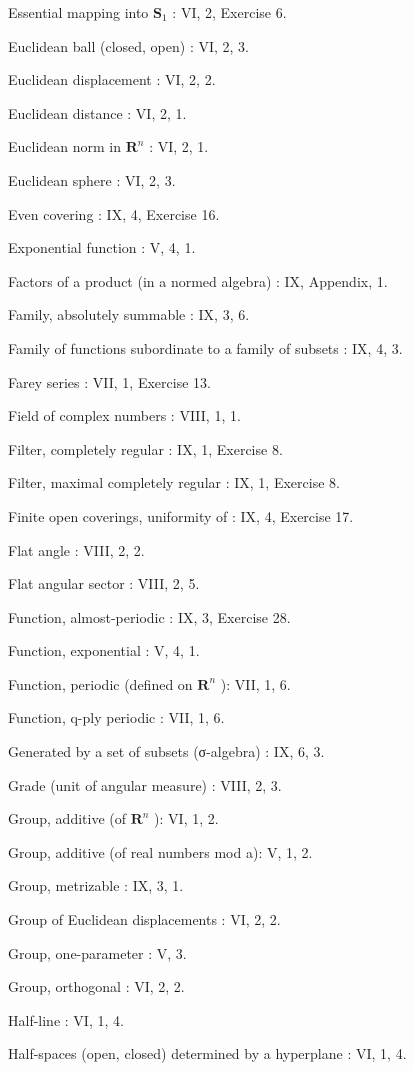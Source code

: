 Essential mapping into \(\mathbf{S}_1\) : VI, 2, Exercise 6.

Euclidean ball (closed, open) : VI, 2, 3.

Euclidean displacement : VI, 2, 2.

Euclidean distance : VI, 2, 1.

Euclidean norm in \(\mathbf{R}^n\) : VI, 2, 1.

Euclidean sphere : VI, 2, 3.

Even covering : IX, 4, Exercise 16.

Exponential function : V, 4, 1.

Factors of a product (in a normed algebra) : IX, Appendix, 1.

Family, absolutely summable : IX, 3, 6.

Family of functions subordinate to a family of subsets : IX, 4, 3.

Farey series : VII, 1, Exercise 13.

Field of complex numbers : VIII, 1, 1.

Filter, completely regular : IX, 1, Exercise 8.

Filter, maximal completely regular : IX, 1, Exercise 8.

Finite open coverings, uniformity of : IX, 4, Exercise 17.

Flat angle : VIII, 2, 2.

Flat angular sector : VIII, 2, 5.

Function, almost-periodic : IX, 3, Exercise 28.

Function, exponential : V, 4, 1.

Function, periodic (defined on \(\mathbf{R}^n\) ): VII, 1, 6.

Function, q-ply periodic : VII, 1, 6.

Generated by a set of subsets (σ-algebra) : IX, 6, 3.

Grade (unit of angular measure) : VIII, 2, 3.

Group, additive (of \(\mathbf{R}^n\) ): VI, 1, 2.

Group, additive (of real numbers mod a): V, 1, 2.

Group, metrizable : IX, 3, 1.

Group of Euclidean displacements : VI, 2, 2.

Group, one-parameter : V, 3.

Group, orthogonal : VI, 2, 2.

Half-line : VI, 1, 4.

Half-spaces (open, closed) determined by a hyperplane : VI, 1, 4.


